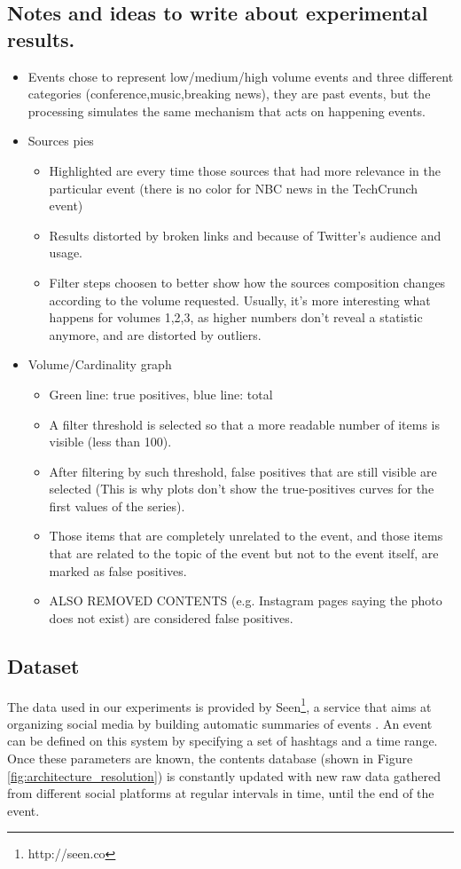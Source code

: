 \documentclass{sig-alternate}
\begin{document}
\subsection{Notes and ideas to write about experimental results.}
\begin{itemize}
\item Events chose to represent low/medium/high volume events and three different categories (conference,music,breaking news), they are past events, but the processing simulates the same mechanism that acts on happening events.
\item Sources pies
  \begin{itemize}
    \item Highlighted are every time those sources that had more relevance in the particular event (there is no color for NBC news in the TechCrunch event)
    \item Results distorted by broken links and because of Twitter's audience and usage.
    \item Filter steps choosen to better show how the sources composition changes according to the volume requested. Usually, it's more interesting what happens for volumes 1,2,3, as higher numbers don't reveal a statistic anymore, and are distorted by outliers.
  \end{itemize}
\item Volume/Cardinality graph
\begin{itemize}
    \item Green line: true positives, blue line: total
    \item A filter threshold is selected so that a more readable number of items is visible (less than 100).
    \item After filtering by such threshold, false positives that are still visible are selected (This is why plots don't show the true-positives curves for the first values of the series).
    \item Those items that are completely unrelated to the event, and those items that are related to the topic of the event but not to the event itself, are marked as false positives.
    \item ALSO REMOVED CONTENTS (e.g. Instagram pages saying the photo does not exist) are considered false positives.
\end{itemize}
\end{itemize}

\subsection{Dataset}
\label{sec:dataset}
The data used in our experiments is provided by Seen\footnote{http://seen.co}, a service that aims at organizing social media by building automatic summaries of events \cite{SeenWired}. An event can be defined on this system by specifying a set of hashtags and a time range. Once these parameters are known, the contents database (shown in Figure \ref{fig:architecture_resolution}) is constantly updated with new raw data gathered from different social platforms at regular intervals in time, until the end of the event.
\end{document}
